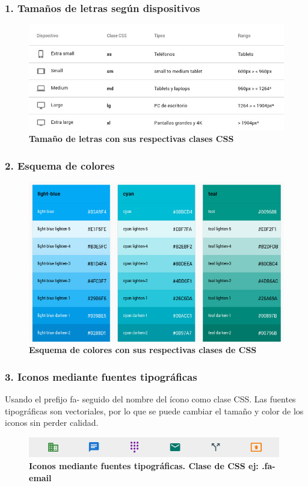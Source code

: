\subsubsection{1. Tamaños de letras según dispositivos}
    \begin{figure}[h]
    \includegraphics[width=14cm]{Img/UX/guia1.jpg}
    \centering
    \caption{\textbf{ \footnotesize{Tamaño de letras con sus respectivas clases CSS}}}
\end{figure} 
    
\subsubsection{2. Esquema de colores}
\begin{figure}[h]
    \includegraphics[width=12cm]{Img/UX/guia0.jpg}
    \centering
    \caption{\textbf{ \footnotesize{Esquema de colores con sus respectivas clases de CSS}}}
\end{figure}


\subsubsection{3. Iconos mediante fuentes tipográficas}
    Usando el prefijo fa- seguido del nombre del ícono como clase CSS. Las fuentes tipográficas son vectoriales, por lo que se puede cambiar el tamaño y color de los iconos sin perder calidad.
    \begin{figure}[h]
    \includegraphics[width=11cm]{Img/UX/guia3.jpg}
    \centering
    \caption{\textbf{ \footnotesize{Iconos mediante fuentes tipográficas. Clase de CSS ej: .fa-email}}}
   
    \end{figure}
    
